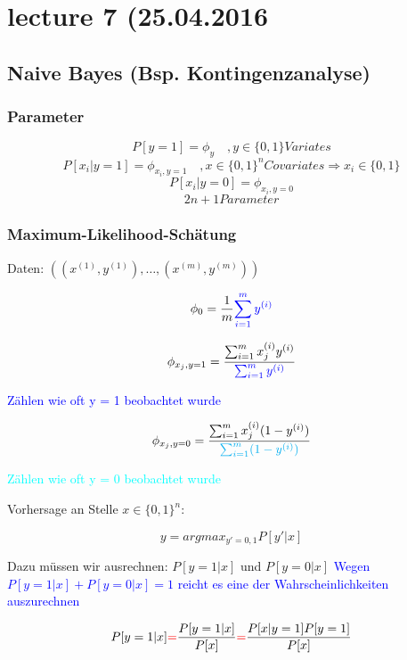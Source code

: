 \newcommand{\xj}[1]{\phi_{x_j, y=#1}}

\section*{lecture 7 (25.04.2016}
\subsection*{Naive Bayes (Bsp. Kontingenzanalyse)}
	\subsubsection*{Parameter}
		\[ P[y=1] = \phi_y \quad, y \in \{0,1\} Variates\]
		\[ P[x_i|y=1] = \phi_{x_i, y = 1} \quad, x \in \{0,1\}^n Covariates  \Rightarrow x_i \in \{0,1\}\]
		\[ P[x_i|y=0] = \phi_{x_i, y = 0}\]
		\[2n + 1 Parameter \]
	
	\subsubsection*{Maximum-Likelihood-Schätung}
	
		Daten: $ ((x^{(1)},y^{(1)}),\dots,(x^{(m)},y^{(m)}) ) $
		
		\[ \phi_0 = \frac{1}{m} \textcolor{blue}{\sum_{i = 1}^{m} y^{(i)}}\]
		
		\[ \xj{1} = \frac{\sum_{i=1}^{m} x_j ^{(i)} y^{(i)}}{\textcolor{blue}{\sum_{i=1}^{m}y^{(i)}}} \]
			
			\textcolor{blue}{Zählen wie oft y = 1 beobachtet wurde}
			
		\[ \xj{0} =  \frac{\sum_{i=1}^{m} x_j ^{(i)} (1- y^{(i)})}{\textcolor{cyan}{\sum_{i=1}^{m}(1- y^{(i)})}} \]
		
			\textcolor{cyan}{Zählen wie oft y = 0 beobachtet wurde}
			
		Vorhersage an Stelle $ x \in \{0,1\}^n $:
		
		\begin{framed}
			\[ y = argmax_{y' = 0,1} P[y'|x] \]
		\end{framed}
		
		Dazu müssen wir ausrechnen: $ P[y = 1|x] $ und $ P[y = 0|x] $
		\textcolor{blue}{Wegen $ P[y = 1|x] + P[y = 0|x] = 1$ reicht es eine der Wahrscheinlichkeiten auszurechnen} 
		
		\[ P[y = 1|x] \textcolor{red}{=} \frac{P[y = 1|x]}{P[x]} \textcolor{red}{=} \frac{P[x| y = 1]P[y = 1]}{P[x]} \]
		

